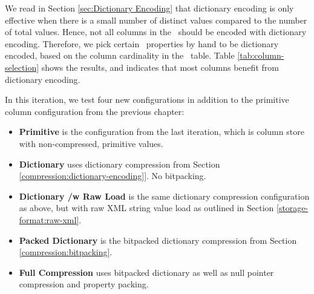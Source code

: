 We read in Section \ref{sec:Dictionary Encoding} that dictionary encoding is only effective when there is a small number of distinct values compared to the number of total values. Hence, not all columns in the \tpchdl~should be encoded with dictionary encoding. Therefore, we pick certain \lineitem~properties by hand to be dictionary encoded, based on the column cardinality in the \lineitem~table. Table \ref{tab:column-selection} shows the results, and indicates that most columns benefit from dictionary encoding.

In this iteration, we test four new configurations in addition to the primitive column configuration from the previous chapter:
\begin{itemize}
    \item \textbf{Primitive} is the configuration from the last iteration, which is column store with non-compressed, primitive values.
    \item \textbf{Dictionary} uses dictionary compression from Section \ref{compression:dictionary-encoding]}. No bitpacking.
    \item \textbf{Dictionary /w Raw Load} is the same dictionary compression configuration as above, but with raw XML string value load as outlined in Section \ref{storage-format:raw-xml}.
    \item \textbf{Packed Dictionary} is the bitpacked dictionary compression from Section \ref{compression:bitpacking}.
    \item \textbf{Full Compression} uses bitpacked dictionary as well as null pointer compression and property packing.
\end{itemize}


